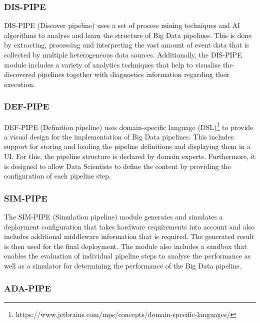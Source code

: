 \documentclass{article}
\begin{document}
                \subsubsection*{DIS-PIPE}

                    DIS-PIPE (Discover pipeline) uses a set of process mining techniques and AI algorithms to analyse and learn the structure of Big Data pipelines. This is done by extracting, processing and interpreting the vast amount of event data that is collected by multiple heterogeneous data sources. Additionally, the DIS-PIPE module includes a variety of analytics techniques that help to visualise the discovered pipelines together with diagnostics information regarding their execution. 

                \subsubsection*{DEF-PIPE}

                    DEF-PIPE (Definition pipeline) uses domain-specific language (DSL)\footnote{https://www.jetbrains.com/mps/concepts/domain-specific-languages/} to provide a visual design for the implementation of Big Data pipelines.
                    This includes support for storing and loading the pipeline definitions and displaying them in a UI. For this, the pipeline structure is declared by domain experts.
                    Furthermore, it is designed to allow Data Scientists to define the content by providing the configuration of each pipeline step.

                \subsubsection*{SIM-PIPE}

                    The SIM-PIPE (Simulation pipeline) module generates and simulates a deployment configuration that takes hardware requirements into account and also includes additional middleware information that is required. The generated result is then used for the final deployment.
                    The module also includes a sandbox that enables the evaluation of individual pipeline steps to analyse the performance as well as a simulator for determining the performance of the Big Data pipeline.
                    
                \subsubsection*{ADA-PIPE}
\end{document}
